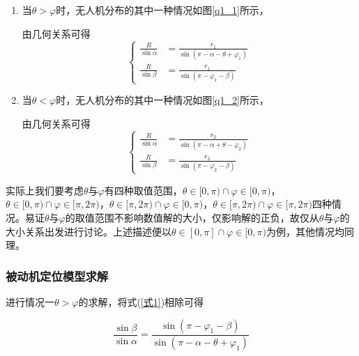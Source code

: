 \documentclass[withoutpreface,bwprint]{cumcmthesis} %
\begin{document}
\begin{enumerate}
    \item 当$\theta>\varphi$时，无人机分布的其中一种情况如图\ref{q1_1}所示，

    由几何关系可得
    \begin{equation}
    \left\{
    \begin{aligned}
        \frac{R}{\sin\alpha} &= \frac{r_1}{\sin(\pi - \alpha - \theta + \varphi_1)} \\
        \frac{R}{\sin\beta} &= \frac{r_1}{\sin(\pi - \varphi_1 - \beta)}
    \end{aligned}
    \right.
    \label{式1}
    \end{equation}

    \item 当$\theta<\varphi$时，无人机分布的其中一种情况如图\ref{q1_2}所示，
    
    由几何关系可得
    \begin{equation}
    \left\{
        \begin{aligned}
            \frac{R}{\sin\alpha} &= \frac{r_2}{\sin(\pi - \alpha + \theta - \varphi_2)} \\
            \frac{R}{\sin\beta} &= \frac{r_2}{\sin(\pi - \varphi_2 - \beta)}
        \end{aligned}
    \right.
    \label{式2}
    \end{equation}
    
\end{enumerate}

实际上我们要考虑$\theta$与$\varphi$有四种取值范围，$\theta \in[0,\pi)\cap \varphi \in[0,\pi)$，$\theta \in[0,\pi)\cap \varphi \in[\pi,2\pi)$，$\theta \in[\pi,2\pi)\cap \varphi \in[0,\pi)$，$\theta \in[\pi,2\pi)\cap \varphi \in[\pi,2\pi)$四种情况。易证$\theta$与$\varphi$的取值范围不影响数值解的大小，仅影响解的正负，故仅从$\theta$与$\varphi$的大小关系出发进行讨论。上述描述便以$\theta \in[0,\pi]\cap \varphi \in[0,\pi)$为例，其他情况均同理。







\subsubsection{被动机定位模型求解}

进行情况一$\theta>\varphi$的求解，将式(\ref{式1})相除可得

\begin{equation}
    \frac{\sin\beta}{\sin\alpha} = \frac{\sin(\pi - \varphi_1 -\beta)}{\sin(\pi - \alpha - \theta + \varphi_1)}
\end{equation}
\end{document}
